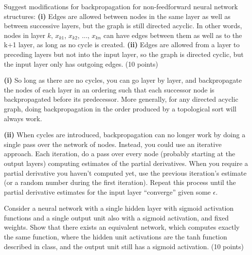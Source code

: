 \documentclass[fleqn]{homework}
\begin{document}
  \maketitle

  \begin{problem}{1}
    \begin{question}
      Suggest modifications for backpropagation for non-feedforward neural
      network structures: \textbf{(i)} Edges are allowed between nodes in the
      same layer as well as between successive layers, but the graph is still
      directed acyclic. In other words, nodes in layer $k$, $x_{k1}$, $x_{k2}$,
      ..., $x_{kn}$ can have edges between them as well as to the k+1 layer, as
      long as no cycle is created. \textbf{(ii)} Edges are allowed from a layer
      to preceding layers but not into the input layer, so the graph is directed
      cyclic, but the input layer only has outgoing edges. (10 points)
    \end{question}

    \textbf{(i)} So long as there are no cycles, you can go layer by layer, and
    backpropagate the nodes of each layer in an ordering such that each
    successor node is backpropagated before its predecessor.  More generally,
    for any directed acyclic graph, doing backpropagation in the order produced
    by a topological sort will always work.

    \textbf{(ii)} When cycles are introduced, backpropagation can no longer work
    by doing a single pass over the network of nodes.  Instead, you could use an
    iterative approach.  Each iteration, do a pass over every node (probably
    starting at the output layers) computing estimates of the partial
    derivatives.  When you require a partial derivative you haven't computed
    yet, use the previous iteration's estimate (or a random number during the
    first iteration).  Repeat this process until the partial derivative
    estimates for the input layer ``converge'' given some $\epsilon$.
  \end{problem}

  \begin{problem}{2}
    \begin{question}
      Consider a neural network with a single hidden layer with sigmoid
      activation functions and a single output unit also with a sigmoid
      activation, and fixed weights. Show that there exists an equivalent
      network, which computes exactly the same function, where the hidden unit
      activations are the tanh function described in class, and the output unit
      still has a sigmoid activation. (10 points)
    \end{question}
  \end{problem}
\end{document}
